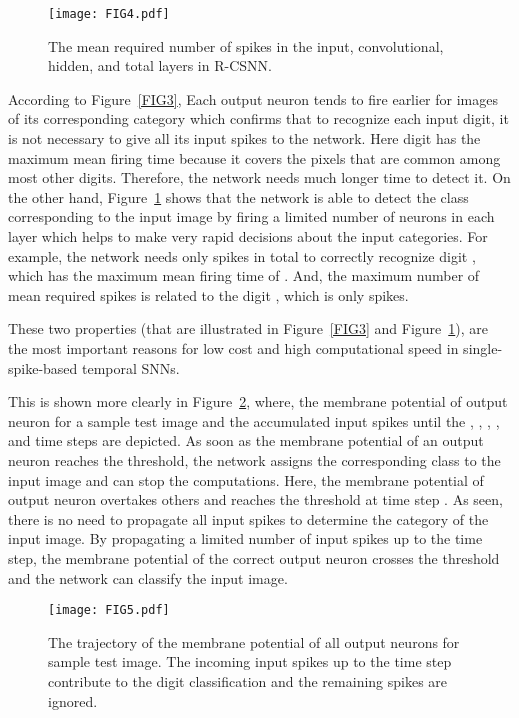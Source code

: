 \documentclass[preprint,twocolumn,5p,12pt]{article}
\begin{document}
\begin{figure}[ht]
\centering
\texttt{[image: FIG4.pdf]}  \caption{The mean required number of spikes in the input, convolutional, hidden, and total layers in R-CSNN.} \label{FIG4}
\end{figure}
According to Figure~\ref{FIG3}, Each output neuron tends to fire earlier for images of its corresponding category which confirms that to recognize each input digit, it is not necessary to give all its input spikes to the network. 
Here digit  has the maximum mean firing time because it covers the pixels that are common among most other digits. Therefore, the network needs much longer time to detect it.
On the other hand, Figure~\ref{FIG4} shows that the network is able to detect the class corresponding to the input image by firing a limited number of neurons in each layer which helps to make very rapid decisions about the input categories.
For example, the network needs only  spikes in total to correctly recognize digit , which has the maximum mean firing time of .
And, the maximum number of mean required spikes is related to the digit , which is only  spikes.

These two properties (that are illustrated in Figure~\ref{FIG3} and Figure~\ref{FIG4}), are the most important reasons for low cost and high computational speed in single-spike-based temporal SNNs.

This  is shown more clearly in Figure~\ref{FIG5}, where, the membrane potential of output neuron for a sample  test image and the accumulated input spikes until the , , , , and  time steps are depicted.
As soon as the membrane potential of an output neuron reaches the threshold, the network assigns the corresponding class to the input image and can stop the computations. 
Here, the membrane potential of  output neuron overtakes others and reaches the threshold at time step . 
As seen, there is no need to propagate all input spikes to determine the category of the input image. By propagating a limited number of input spikes up to the  time step, the membrane potential of the correct output neuron crosses the threshold and the network can classify the input image.

\begin{figure}
\centering
\texttt{[image: FIG5.pdf]}  
\caption{The trajectory of the membrane potential of all output neurons for sample   test image. The incoming input spikes up to the time step  contribute to the digit classification and the remaining spikes are ignored.} \label{FIG5}
\end{figure}
\end{document}
